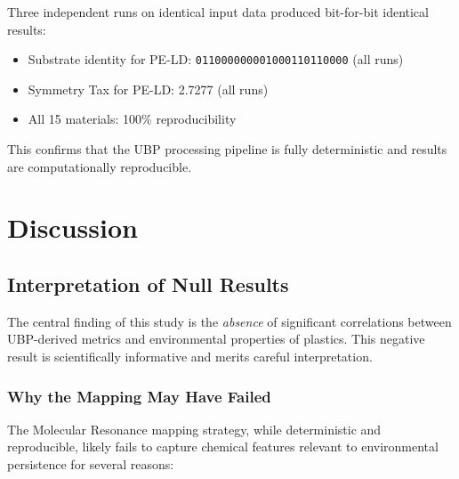 \documentclass[11pt,letterpaper]{article}
\begin{document}
Three independent runs on identical input data produced bit-for-bit identical results:
\begin{itemize}
    \item Substrate identity for PE-LD: \texttt{011000000001000110110000} (all runs)
    \item Symmetry Tax for PE-LD: 2.7277 (all runs)
    \item All 15 materials: 100\% reproducibility
\end{itemize}

This confirms that the UBP processing pipeline is fully deterministic and results are computationally reproducible.

\section{Discussion}

\subsection{Interpretation of Null Results}

The central finding of this study is the \textit{absence} of significant correlations between UBP-derived metrics and environmental properties of plastics. This negative result is scientifically informative and merits careful interpretation.

\subsubsection{Why the Mapping May Have Failed}

The Molecular Resonance mapping strategy, while deterministic and reproducible, likely fails to capture chemical features relevant to environmental persistence for several reasons:
\end{document}

